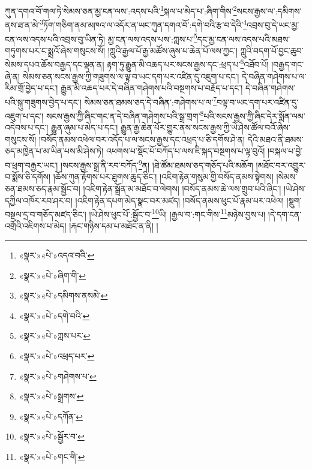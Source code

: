 ཀུན་དགའ་བོ་གལ་ཏེ་སེམས་ཅན་མྱ་ངན་ལས་:འདས་པའི་\footnote{«སྣར་»«པེ་»འདའ་བའི་}སྐལ་པ་མེད་པ་:ཞིག་གིས་\footnote{«སྣར་»«པེ་»ཞིག་གི་}སངས་རྒྱས་ལ་:དམིགས་ནས་ཐ་ན་མེ་\footnote{«སྣར་»«པེ་»དམིགས་ནསམེ་}ཏོག་གཅིག་ནམ་མཁའ་ལ་འདོར་ན་ཡང་ཀུན་དགའ་བོ་:དགེ་བའི་རྩ་བ་དེའི་\footnote{«སྣར་»«པེ་»དགེ་བའི་}འབྲས་བུ་དེ་ཡང་མྱ་ངན་ལས་འདས་པའི་འབྲས་བུ་ཡིན་ཏེ། མྱ་ངན་ལས་འདས་པས་:ཀླས་པ་\footnote{«སྣར་»«པེ་»ཀླས་པར་}དང་མྱ་ངན་ལས་འདས་པའི་མཐས་གཏུགས་པར་ང་སྨྲའོ་ཞེས་གསུངས་སོ། །ཀླུའི་རྒྱལ་པོ་རྒྱ་མཚོས་ཞུས་པ་ཆེན་པོ་ལས་ཀྱང་། ཀླུའི་བདག་པོ་བྱང་ཆུབ་སེམས་དཔའ་ཆོས་བརྒྱད་དང་ལྡན་ན། རྟག་ཏུ་རྒྱུན་མི་འཆད་པར་སངས་རྒྱས་དང་:ཕྲད་པ་\footnote{«སྣར་»«པེ་»འཕྲད་པར་}འཐོབ་པོ། །བརྒྱད་གང་ཞེ་ན། སེམས་ཅན་སངས་རྒྱས་ཀྱི་གཟུགས་ལ་ལྟ་བ་ཡང་དག་པར་འཛིན་དུ་འཇུག་པ་དང་། དེ་བཞིན་གཤེགས་པ་ལ་རིམ་གྲོ་བྱེད་པ་དང་། རྒྱུན་མི་འཆད་པར་དེ་བཞིན་གཤེགས་པའི་བསྔགས་པ་བརྗོད་པ་དང་། དེ་བཞིན་གཤེགས་པའི་སྐུ་གཟུགས་བྱེད་པ་དང་། སེམས་ཅན་ཐམས་ཅད་དེ་བཞིན་:གཤེགས་པ་ལ་\footnote{«སྣར་»«པེ་»གཤེགས་པ་}བལྟ་བ་ཡང་དག་པར་འཛིན་དུ་འཇུག་པ་དང་། སངས་རྒྱས་ཀྱི་ཞིང་གང་ན་དེ་བཞིན་གཤེགས་པའི་སྒྲ་གྲག་\footnote{«སྣར་»«པེ་»སྒྲགས་}པའི་སངས་རྒྱས་ཀྱི་ཞིང་དེར་སྨོན་ལམ་འདེབས་པ་དང་། རྒྱུན་ཞུམ་པ་མེད་པ་དང་། རྒྱུན་རྒྱ་ཆེན་པོར་གྱུར་ནས་སངས་རྒྱས་ཀྱི་ཡེ་ཤེས་ཚོལ་བའོ་ཞེས་གསུངས་སོ། །བསོད་ནམས་འཕེལ་བར་འདོད་པ་ལ་སངས་རྒྱས་དང་འཕྲད་པ་ཅི་དགོས་ཤེ་ན། དེའི་མཐའ་ནི་ཐམས་ཅད་མཁྱེན་པ་མ་ཡིན་པས་མི་ཤེས་ཏེ། འཕགས་པ་སྡོང་པོ་བཀོད་པ་ལས་ཇི་སྐད་བསྔགས་པ་ལྟ་བུའོ། །བསྐལ་པ་བྱེ་བ་ཕྲག་བརྒྱར་ཡང་། །སངས་རྒྱས་སྒྲ་ནི་རབ་བཀོད་\footnote{«སྣར་»«པེ་»དཀོན་}ན། །ཐེ་ཚོམ་ཐམས་ཅད་གཅོད་པའི་མཆོག །མཐོང་བར་འགྱུར་བ་སྨོས་ཅི་དགོས། །ཆོས་ཀུན་རྟོགས་པར་ཐུགས་ཆུད་ཅིང་། །འཇིག་རྟེན་གསུམ་གྱི་བསོད་ནམས་སྟེགས། །སེམས་ཅན་ཐམས་ཅད་རྣམ་སྦྱོང་བ། །འཇིག་རྟེན་སྒྲོན་མ་མཐོང་བ་ལེགས། །བསོད་ནམས་ཆེ་ལས་གྲུབ་པའི་ཞིང་། །ཡེ་ཤེས་དཀྱིལ་འཁོར་རབ་ཤར་བ། །འཇིག་རྟེན་དཔག་མེད་སྣང་བར་མཛད། །བསོད་ནམས་ཕུང་པོ་རྣམ་པར་འཕེལ། །སྡུག་བསྔལ་དྲ་བ་གཅོད་མཛད་ཅིང་། །ཡེ་ཤེས་ཕུང་པོ་:སྦྱོང་བ་\footnote{«སྣར་»«པེ་»སྦྱོར་བ་}ཡི། །རྒྱལ་བ་:གང་གིས་\footnote{«སྣར་»«པེ་»གང་གི་}མཉེས་བྱས་པ། །དེ་དག་ངན་འགྲོའི་འཇིགས་པ་མེད། །རྐང་གཉིས་དམ་པ་མཐོང་ན་ནི། །
